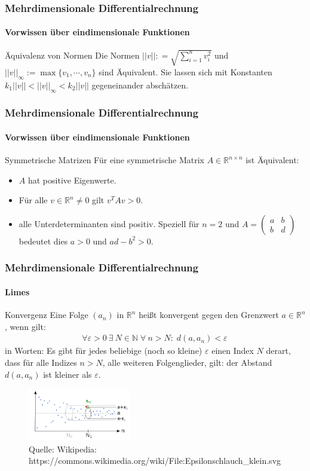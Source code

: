 \documentclass{beamer}
\begin{document}
\begin{frame}
    \frametitle{Mehrdimensionale Differentialrechnung}
\framesubtitle{Vorwissen über eindimensionale  Funktionen}
    \begin{block}{Äquivalenz von Normen}
 Die Normen $||v||: = \sqrt{\sum_{i = 1}^n v_i^2}$ und $||v||_{\infty}:= \max \{ v_1, \cdots, v_n \} $ sind Äquivalent. Sie lassen sich  mit Konstanten $k_1 ||v|| < ||v||_{\infty}  < k_2  ||v|| $ gegeneinander abschätzen.
\end{block}

 \end{frame}

\begin{frame}
    \frametitle{Mehrdimensionale Differentialrechnung}
\framesubtitle{Vorwissen über eindimensionale  Funktionen}
    \begin{block}{Symmetrische Matrizen}
 Für eine symmetrische Matrix $A \in \mathbb{R}^{n \times n}$ ist Äquivalent:
\begin{itemize}
\item $A$ hat positive Eigenwerte.
\item Für alle $v \in \mathbb{R}^n \neq 0$ gilt  $v^TA v > 0 $.
\item alle Unterdeterminanten sind positiv. Speziell für $n=2$ und $A = \begin{pmatrix} a & b \\ b & d\end{pmatrix}$ bedeutet dies
$a >0$ und $ad -b^2 >0$. 
\end{itemize}
\end{block}

 \end{frame}


\begin{frame}
    \frametitle{Mehrdimensionale Differentialrechnung}
\framesubtitle{Limes}
    \begin{block}{Konvergenz}
Eine Folge $(a_n)$ in $\mathbb{R}^n$ heißt konvergent gegen den Grenzwert $a \in \mathbb{R}^n$, wenn gilt:
\begin{align*}
\forall {\varepsilon > 0} \ \exists \ N \in \mathbb{N} \; \forall \ n > N: \; d(a, a_n) < \varepsilon\,
\end{align*}
in Worten: Es gibt für jedes beliebige (noch so kleine) $\varepsilon$ einen Index $N$ derart, dass für alle Indizes $n > N$, alle weiteren Folgenglieder, gilt: der Abstand $d(a, a_n)$ ist kleiner als $\varepsilon$.
\end{block}
\begin{figure}[H]
      \centering
    \includegraphics[width=0.4\textwidth]{images/500px-Epsilonschlauch_klein}
      \caption{Quelle: Wikipedia: https://commons.wikimedia.org/wiki/File:Epsilonschlauch\_klein.svg}
\end{figure}

 \end{frame}
\end{document}
